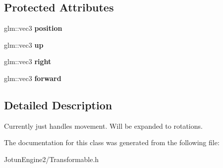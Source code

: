 \subsection*{Protected Attributes}
\begin{DoxyCompactItemize}
\item 
\hypertarget{class_transformable_a5328279453d732a876cd4b83b1f798c6}{glm\-::vec3 {\bfseries position}}\label{class_transformable_a5328279453d732a876cd4b83b1f798c6}

\item 
\hypertarget{class_transformable_aaa4b38b0d297c151b82ec3e232f505a3}{glm\-::vec3 {\bfseries up}}\label{class_transformable_aaa4b38b0d297c151b82ec3e232f505a3}

\item 
\hypertarget{class_transformable_a446e08f16f840276d9c9abd31ab860ac}{glm\-::vec3 {\bfseries right}}\label{class_transformable_a446e08f16f840276d9c9abd31ab860ac}

\item 
\hypertarget{class_transformable_aed738f59a4968fe33c9b62ef74d77001}{glm\-::vec3 {\bfseries forward}}\label{class_transformable_aed738f59a4968fe33c9b62ef74d77001}

\end{DoxyCompactItemize}


\subsection{Detailed Description}
Currently just handles movement. Will be expanded to rotations. 

The documentation for this class was generated from the following file\-:\begin{DoxyCompactItemize}
\item 
Jotun\-Engine2/Transformable.\-h\end{DoxyCompactItemize}
